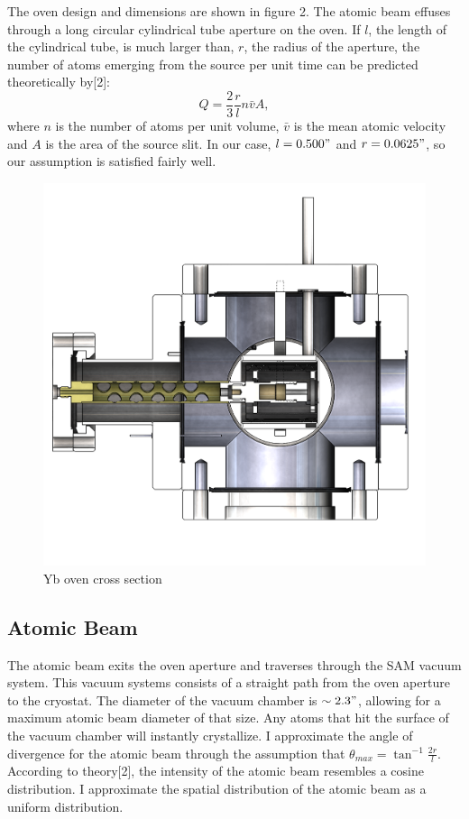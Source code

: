 \documentclass[12pt, a4paper]{article}
\begin{document}
The oven design and dimensions are shown in figure 2. The atomic beam effuses through a long circular cylindrical tube aperture on the oven. If $l$, the length of the cylindrical tube, is much larger than, $r$, the radius of the aperture, the number of atoms emerging from the source per unit time can be predicted theoretically by[2]:
\begin{equation}
Q = \frac{2}{3}\frac{r}{l}n\bar{v}A,
\end{equation}
where $n$ is the number of atoms per unit volume, $\bar{v}$ is the mean atomic velocity and $A$ is the area of the source slit. In our case, $l = 0.500"$ and $r = 0.0625"$, so our assumption is satisfied fairly well.
\begin{figure}[h]
\centering
\captionsetup{justification=centering}
  \includegraphics[scale=0.22]{ybOvenCrosssection.PNG}
  \vspace*{-3mm}
  \caption{Yb oven cross section}
\end{figure}

\subsection{Atomic Beam}
The atomic beam exits the oven aperture and traverses through the SAM vacuum system. This vacuum systems consists of a straight path from the oven aperture to the cryostat. The diameter of the vacuum chamber is $\sim 2.3"$, allowing for a maximum atomic beam diameter of that size. Any atoms that hit the surface of the vacuum chamber will instantly crystallize. I approximate the angle of divergence for the atomic beam through the assumption that $\theta_{max} = \tan^{-1}\frac{2r}{l}$. According to theory[2], the intensity of the atomic beam resembles a cosine distribution. I approximate the spatial distribution of the atomic beam as a uniform distribution.
\end{document}
